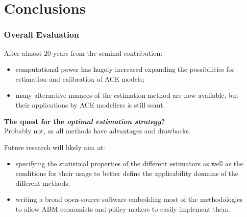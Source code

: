\documentclass[10pt]{beamer}
\begin{document}
\section{Conclusions}
\label{sec:conclusion}

\begin{frame}[c]\frametitle{Overall Evaluation}
	After almost 20 years from the \cite{gilli2001estimation} seminal contribution:
	\begin{itemize}
		\item computational power has hugely increased expanding the possibilities for estimation and calibration of ACE models;
		\item many alternative nuances of the estimation method are now available, but their applications by ACE modellers is still scant.
	\end{itemize} \medskip

	\alert{\textbf{The quest for the \emph{optimal estimation strategy}?}}
	\\ Probably not, as all methods have advantages and drawbacks. \medskip

	Future research will likely aim at:
	\begin{itemize}
		\item specifying the statistical properties of the different estimators as well as the conditions for their usage to better define the applicability domains of the different methods;
		\item writing a broad open-source software embedding most of the methodologies to allow ABM economists and policy-makers to easily implement them.
	\end{itemize}
\end{frame}
\end{document}
